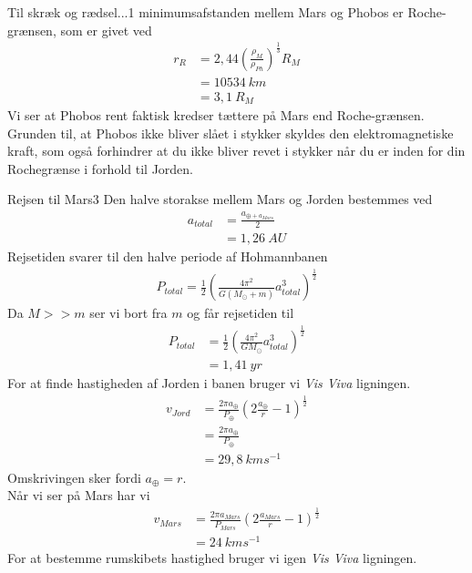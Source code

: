 \begin{opgave}{Til skræk og rædsel...}{1}
\opg minimumsafstanden mellem Mars og Phobos er Roche-grænsen, som er givet ved
\begin{align*}
r_R &= 2,44 \left( \frac{\rho_M}{\rho_{Ph}} \right) ^{\frac{1}{3}} R_M\\
&= 10534~\si{km}\\
&= 3,1~\si{R_M}
\end{align*}
\opg Vi ser at Phobos rent faktisk kredser tættere på Mars end Roche-grænsen. Grunden til, at Phobos ikke bliver slået i stykker skyldes den elektromagnetiske kraft, som også forhindrer at du ikke bliver revet i stykker når du er inden for din Rochegrænse i forhold til Jorden. 
\end{opgave}

\begin{opgave}{Rejsen til Mars}{3}
\opg Den halve storakse mellem Mars og Jorden bestemmes ved
\begin{align*}
a_{total}&=\frac{a_{\oplus + a_{Mars}}}{2}\\
&=1,26~\si{AU}
\end{align*}
\opg Rejsetiden svarer til den halve periode af Hohmannbanen
\begin{align*}
P_{total} = \frac{1}{2} \left( \frac{4\pi ^2}{G\left( M_{\odot}+m\right) } a_{total}^3 \right) ^{\frac{1}{2}} 
\end{align*}
Da $M>>m$ ser vi bort fra $m$ og får rejsetiden til 
\begin{align*}
P_{total} &= \frac{1}{2} \left( \frac{4\pi ^2}{GM_{\odot} } a_{total}^3 \right) ^{\frac{1}{2}}\\
&=1,41~\si{yr}
\end{align*}
\opg For at finde hastigheden af Jorden i banen bruger vi \textsl{Vis Viva} ligningen.
\begin{align*}
v_{Jord} &= \frac{2\pi a_{\oplus}}{P_{\oplus}} \left( 2 \frac{a_{\oplus}}{r} -1\right) ^{\frac{1}{2}}\\
&=\frac{2\pi a_{\oplus}}{P_{\oplus}}\\
&=29,8~\si{km} \si{s}^{-1}
\end{align*}
Omskrivingen sker fordi $a_{\oplus}=r$. \\
Når vi ser på Mars har vi 
\begin{align*}
v_{Mars} &= \frac{2\pi a_{Mars}}{P_{Mars}} \left( 2 \frac{a_{Mars}}{r} -1\right) ^{\frac{1}{2}}\\
&=24~\si{km} \si{s^{-1}}
\end{align*}
\opg For at bestemme rumskibets hastighed bruger vi igen \textsl{Vis Viva} ligningen.

\end{opgave}
